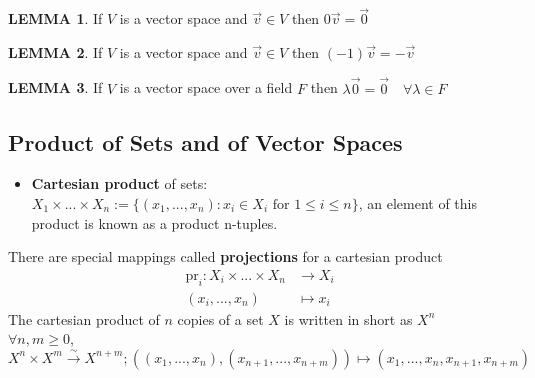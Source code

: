 \documentclass[12pt]{article}
\theoremstyle{definition}
\newtheorem{lemma}{LEMMA}[subsection]
\begin{document}
\begin{lemma}
    If $V$ is a vector space and $\overrightarrow{v} \in V$ then $0\overrightarrow{v} = \overrightarrow{0}$
\end{lemma}
\begin{lemma}
    If $V$ is a vector space and $\overrightarrow{v} \in V$ then $(-1)\overrightarrow{v} = -\overrightarrow{v}$
\end{lemma}
\begin{lemma}
    If $V$ is a vector space over a field $F$ then $\lambda\overrightarrow{0} = \overrightarrow{0} \quad \forall \lambda\in F$
\end{lemma}

\subsection{Product of Sets and of Vector Spaces}
\begin{itemize}
    \item
          \textbf{Cartesian product} of sets: $X_1 \times ... \times X_n := \{(x_1,...,x_n):x_i\in X_i \text{ for } 1 \leq i \leq n\}$, an element of this product is known as a product n-tuples.\newline
\end{itemize}
There are special mappings called \textbf{projections} for a cartesian product
\[\begin{split}
        \text{pr}_i: X_i\times ... \times X_n &\rightarrow X_i\\
        (x_i,...,x_n) &\mapsto x_i
    \end{split}\]
The cartesian product of $n$ copies of a set $X$ is written in short as $X^n$\\

$\forall n,m \geq 0$, $X^n\times X^m\xrightarrow{\sim} X^{n+m}; ((x_1,...,x_n),(x_{n+1},...,x_{n+m}))\mapsto(x_1,...,x_n,x_{n+1},x_{n+m})$

\end{document}
